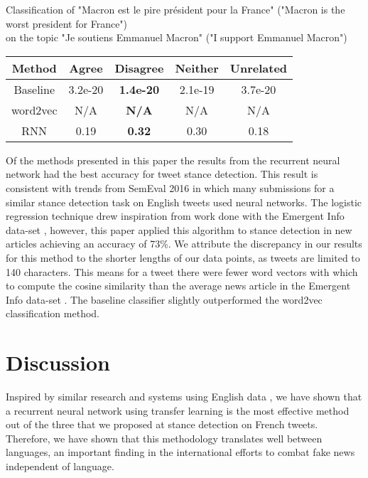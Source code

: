 \documentclass[journal]{IEEEtran}
\begin{document}
Classification of "Macron est le pire pr\'{e}sident pour la France" ("Macron is the worst president for France") \\ on the topic "Je soutiens Emmanuel Macron" ("I support Emmanuel Macron")
\begin{center}
\begin{tabular}{ | c | c | c | c | c |}
\hline
Method & Agree & Disagree & Neither & Unrelated \\[0.7ex]
\hline
Baseline & 3.2e-20 & \textbf{1.4e-20} & 2.1e-19 & 3.7e-20\\
word2vec & N/A & \textbf{N/A} & N/A & N/A \\
RNN & 0.19 & \textbf{0.32} & 0.30 & 0.18 \\
\hline
\end{tabular}
\end{center}


Of the methods presented in this paper the results from the recurrent neural network had the best accuracy for tweet stance detection. This result is consistent with trends from SemEval 2016 \cite{DBLP:journals/corr/ZarrellaM16} in which many submissions for a similar stance detection task on English tweets used neural networks. The logistic regression technique drew inspiration from work done with the Emergent Info data-set \cite{ferreira_vlachos_2016}, however, this paper applied this algorithm to stance detection in new articles achieving an accuracy of 73\%. We attribute the discrepancy in our results for this method to the shorter lengths of our data points, as tweets are limited to 140 characters. This means for a tweet there were fewer word vectors with which to compute the cosine similarity than the average news article in the Emergent Info data-set \cite{ferreira_vlachos_2016}. The baseline classifier slightly outperformed the word2vec classification method. 

\clearpage
\section{Discussion}

Inspired by similar research and systems using English data \cite{DBLP:journals/corr/ZarrellaM16}, we have shown that a recurrent neural network using transfer learning is the most effective method out of the three that we proposed at stance detection on French tweets. Therefore, we have shown that this methodology translates well between languages, an important finding in the international efforts to combat fake news independent of language. 
\end{document}
